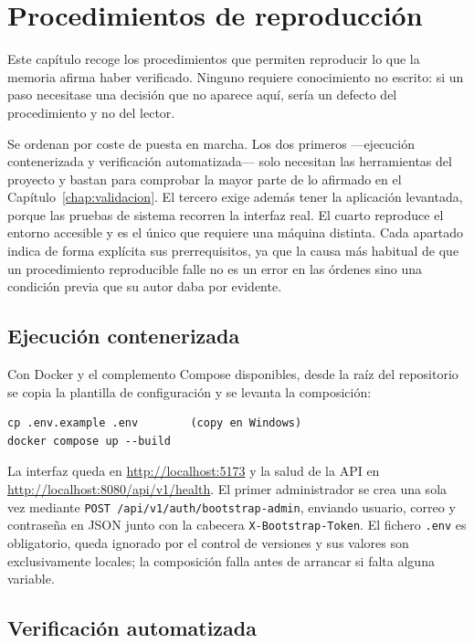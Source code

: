 \chapter{Procedimientos de reproducción}
\label{chap:procedimientos}

Este capítulo recoge los procedimientos que permiten reproducir lo que la memoria afirma haber verificado. Ninguno requiere conocimiento no escrito: si un paso necesitase una decisión que no aparece aquí, sería un defecto del procedimiento y no del lector.

Se ordenan por coste de puesta en marcha. Los dos primeros ---ejecución contenerizada y verificación automatizada--- solo necesitan las herramientas del proyecto y bastan para comprobar la mayor parte de lo afirmado en el Capítulo~\ref{chap:validacion}. El tercero exige además tener la aplicación levantada, porque las pruebas de sistema recorren la interfaz real. El cuarto reproduce el entorno accesible y es el único que requiere una máquina distinta. Cada apartado indica de forma explícita sus prerrequisitos, ya que la causa más habitual de que un procedimiento reproducible falle no es un error en las órdenes sino una condición previa que su autor daba por evidente.

\section{Ejecución contenerizada}

Con Docker y el complemento Compose disponibles, desde la raíz del repositorio se copia la plantilla de configuración y se levanta la composición:

\begin{verbatim}
cp .env.example .env        (copy en Windows)
docker compose up --build
\end{verbatim}

La interfaz queda en \url{http://localhost:5173} y la salud de la API en \url{http://localhost:8080/api/v1/health}. El primer administrador se crea una sola vez mediante \texttt{POST /api/v1/auth/bootstrap-admin}, enviando usuario, correo y contraseña en JSON junto con la cabecera \texttt{X-Bootstrap-Token}. El fichero \texttt{.env} es obligatorio, queda ignorado por el control de versiones y sus valores son exclusivamente locales; la composición falla antes de arrancar si falta alguna variable.

\section{Verificación automatizada}

